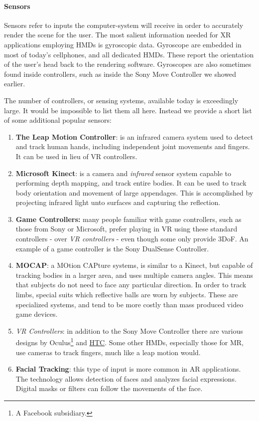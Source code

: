 \paragraph{Sensors}

Sensors refer to inputs the computer-system will receive in order to accurately render the scene for the user. The most salient information needed for XR applications employing HMDs is gyroscopic data. Gyroscope are embedded in most of today's cellphones, and all dedicated HMDs. These report the orientation of the user's head back to the rendering software. Gyroscopes are also sometimes found inside controllers, such as inside the Sony Move Controller we showed earlier. 

The number of controllers, or sensing systems, available today is exceedingly large. It would be impossible to list them all here. Instead we provide a short list of some additional popular sensors: 

\begin{enumerate}
    \item \textbf{The Leap Motion Controller}: is an infrared camera system used to detect and track human hands, including independent joint movements and fingers. It can be used in lieu of VR controllers. 
    \item \textbf{Microsoft Kinect}: is a camera and \textit{infrared} sensor system capable to performing depth mapping, and track entire bodies. It can be used to track body orientation and movement of large appendages. This is accomplished by projecting infrared light unto surfaces and capturing the reflection. 
    \item \textbf{Game Controllers:} many people familiar with game controllers, such as those from Sony or Microsoft, prefer playing in VR using these standard controllers - over \textit{VR controllers} - even though some only provide 3DoF. An example of a game controller is the Sony DualSense Controller.
    \item \textbf{MOCAP}: a MOtion CAPture systems, is similar to a Kinect, but capable of tracking bodies in a larger area, and uses multiple camera angles. This means that subjects do not need to face any particular direction. In order to track limbs, special suits which reflective balls are worn by subjects. These are specialized systems, and tend to be more costly than mass produced video game devices. 
    \item \textit{VR Controllers}: in addition to the Sony Move Controller there are various designs by Oculus\footnote{A Facebook subsidiary.} and \href{https://www.htc.com/us/}{HTC}. Some other HMDs, especially those for MR, use cameras to track fingers, much like a leap motion would. 
    \item \textbf{Facial Tracking}: this type of input is more common in AR applications. The technology allows detection of faces and analyzes facial expressions. Digital masks or filters can follow the movements of the face. 
\end{enumerate}

